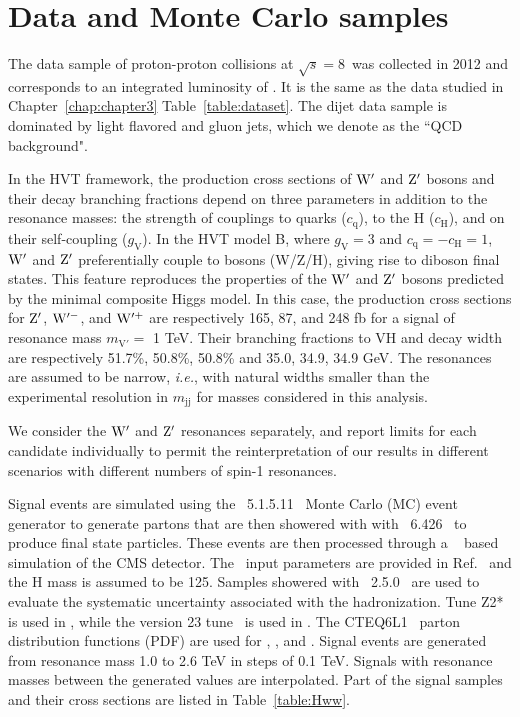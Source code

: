 \newpage

\section{Data and Monte Carlo samples}
\label{sec:data_and_mc_samples}


The data sample of proton-proton collisions at $\sqrt{s}=8$~\TeVcc was collected in 2012 and corresponds to
an integrated luminosity of \intlumi. It is the same as the data studied in 
Chapter~\ref{chap:chapter3} Table~\ref{table:dataset}. 
The dijet data sample is dominated by light flavored and gluon jets, which we denote as 
the ``QCD background".  

In the HVT framework, the production cross sections of 
${\rm W'}$ and ${\rm Z'}$ bosons and their decay branching fractions depend on 
three parameters in addition to the resonance masses:  the 
strength of couplings to quarks ($c_\mathrm{q}$), to the H ($c_\mathrm{H}$),  and on
their self-coupling ($g_\mathrm{V}$).
In the HVT model B, 
where $g_\mathrm{V}=3$ and $c_\mathrm{q}=-c_\mathrm{H}=1$, 
 ${\rm W'}$ and ${\rm Z'}$ preferentially couple to bosons (W/Z/H),
giving rise to diboson final states.
This feature reproduces the properties of the ${\rm W'}$ and ${\rm Z'}$ bosons
 predicted by the minimal composite Higgs model.
In this case, the production cross sections for ${\rm Z'}$,
${\rm W'^{-}}$, and ${\rm W'^{+}}$ are respectively 165, 
87, and 248 fb
for a signal of resonance mass $m_\mathrm{V'} =$ 1 TeV.
Their branching
fractions to VH and decay width are respectively   
51.7\%, 50.8\%, 50.8\% and 35.0, 34.9, 34.9 GeV. 
The resonances are assumed to be narrow, {\it i.e.}, with natural
widths smaller than the experimental resolution in $m_\mathrm{jj}$ for
masses considered in this analysis.

We consider the ${\rm W'}$ and ${\rm Z'}$ 
resonances separately, and report limits for 
each candidate individually to permit 
the reinterpretation of our results in 
different scenarios with different numbers of spin-1 resonances.

Signal events are simulated using 
the \MADGRAPH~5.1.5.11~\cite{madgraph} Monte Carlo (MC) event 
generator to generate partons that are 
then showered with with \PYTHIA~6.426~\cite{Sjostrand:2006za} to 
produce final state particles. These events are then 
processed through a \GEANTfour~\cite{refGEANT} based simulation of 
the CMS detector. The \MADGRAPH~input parameters are 
provided in Ref.~\cite{Pappadopulo:2014qza1} and the H mass 
is assumed to be 125\GeVcc. Samples showered 
with \HERWIG{++}~2.5.0~\cite{herwig} are 
used to evaluate the systematic uncertainty 
associated with the hadronization. Tune Z2*~\cite{bib_tunez1} is 
used in \PYTHIA, while the version 23 tune~\cite{herwig} is 
used in \HERWIG{++}. The CTEQ6L1~\cite{cteq} parton distribution 
functions (PDF) are used for \MADGRAPH, \PYTHIA, and \HERWIG{++}. 
Signal events are generated from resonance mass 1.0 to 2.6 TeV in 
steps of 0.1 TeV. Signals with resonance masses 
between the generated values are interpolated.
Part of the signal samples and their cross sections are listed in Table~\ref{table:Hww}.


